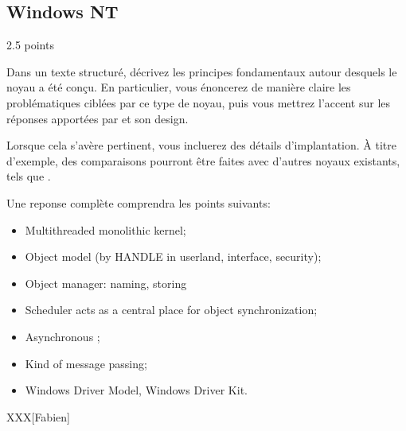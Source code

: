 %
%
\subsection{Windows NT}
{\hfill{} \scriptsize{2.5 points}}

Dans un texte structur\'e, d\'ecrivez les principes fondamentaux autour
desquels le noyau  a \'et\'e con\c{c}u. En particulier, vous
\'enoncerez de mani\`ere claire les probl\'ematiques cibl\'ees par ce type de
noyau, puis vous mettrez l'accent sur les r\'eponses apport\'ees par 
et son design.

Lorsque cela s'av\`ere pertinent, vous incluerez des d\'etails d'implantation.
\`A titre d'exemple, des comparaisons pourront \^etre faites avec d'autres
noyaux existants, tels que .

Une reponse compl\`ete comprendra les points suivants:

\begin{itemize}
  \item
    Multithreaded monolithic kernel;
  \item
    Object model (by HANDLE in userland, interface, security);
  \item
    Object manager: naming, storing \etc{}
  \item
    Scheduler acts as a central place for object synchronization;
  \item
    Asynchronous ;
  \item
    Kind of message passing;
  \item
    Windows Driver Model, Windows Driver Kit.
\end{itemize}

\begin{correction}

XXX[Fabien]

\end{correction}


